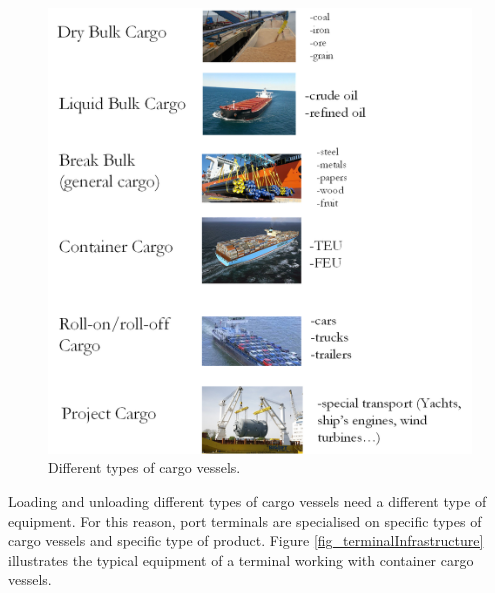 \begin{figure}[hbt!]
\centering
\includegraphics[width=1.0\textwidth]{SectionDistribution/control_figures/fig_cargoProducts.png}
\captionsetup{type=figure}
\caption{Different types of cargo vessels.}
\label{fig_cargoProducts}
\end{figure}

Loading and unloading different types of cargo vessels need a different type of equipment. For this reason, port terminals are specialised on specific types of cargo vessels and specific type of product. Figure \ref{fig_terminalInfrastructure} illustrates the typical equipment of a terminal working with container cargo vessels.

